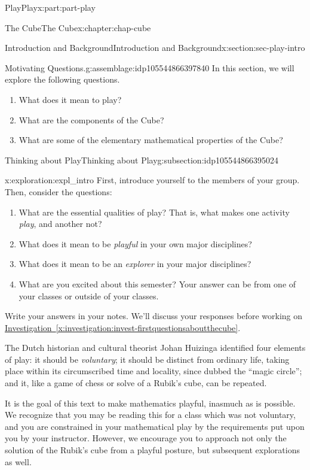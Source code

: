 \documentclass[oneside,10pt,]{book}
\newcommand{\xreffont}{\relax}
\numberwithin{equation}{section}
\begin{document}
\begin{partptx}{Play}{}{Play}{}{}{x:part:part-play}
\begin{chapterptx}{The Cube}{}{The Cube}{}{}{x:chapter:chap-cube}
\begin{sectionptx}{Introduction and Background}{}{Introduction and Background}{}{}{x:section:sec-play-intro}
\begin{introduction}{}
\begin{assemblage}{Motivating Questions.}{g:assemblage:idp105544866397840}%
In this section, we will explore the following questions. %
\begin{enumerate}
\item{}What does it mean to play?%
\item{}What are the components of the Cube?%
\item{}What are some of the elementary mathematical properties of the Cube?%
\end{enumerate}
%
\end{assemblage}
\end{introduction}%
%
%
\typeout{************************************************}
\typeout{************************************************}
%
\begin{subsectionptx}{Thinking about Play}{}{Thinking about Play}{}{}{g:subsection:idp105544866395024}
\begin{exploration}{}{x:exploration:expl_intro}%
First, introduce yourself to the members of your group. Then, consider the questions: %
\begin{enumerate}
\item{}What are the essential qualities of play? That is, what makes one activity \emph{play}, and another not?%
\item{}What does it mean to be \emph{playful} in your own major disciplines?%
\item{}What does it mean to be an \emph{explorer} in your major disciplines?%
\item{}What are you excited about this semester? Your answer can be from one of your classes or outside of your classes.%
\end{enumerate}
 Write your answers in your notes. We'll discuss your responses before working on \hyperref[x:investigation:invest-firstquestionsaboutthecube]{Investigation~{\xreffont\ref{x:investigation:invest-firstquestionsaboutthecube}}}.%
\end{exploration}%
The Dutch historian and cultural theorist Johan Huizinga identified four elements of play: it should be \emph{voluntary}; it should be distinct from ordinary life, taking place within its circumscribed time and locality, since dubbed the ``magic circle''; and it, like a game of chess or solve of a Rubik's cube, can be repeated.%
\par
It is the goal of this text to make mathematics playful, inasmuch as is possible. We recognize that you may be reading this for a class which was not voluntary, and you are constrained in your mathematical play by the requirements put upon you by your instructor. However, we encourage you to approach not only the solution of the Rubik's cube from a playful posture, but subsequent explorations as well.%

\end{subsectionptx}
\end{sectionptx}
\end{chapterptx}
\end{partptx}
\end{document}
